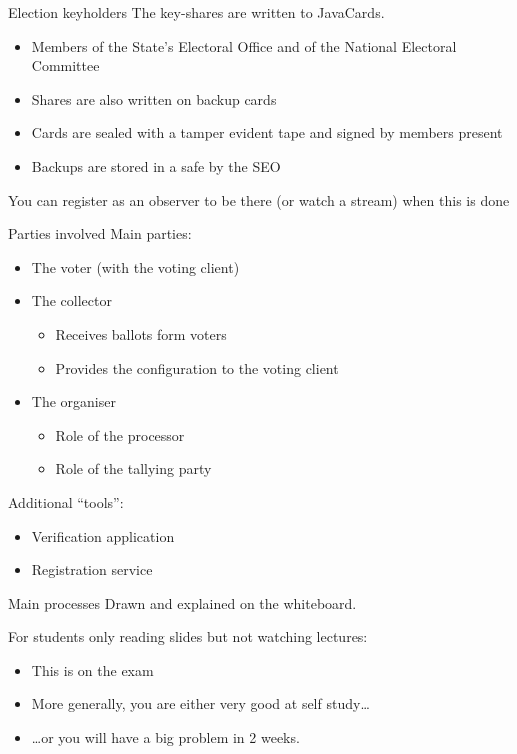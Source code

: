 \begin{frame}{Election keyholders}
  The key-shares are written to JavaCards.
  \begin{itemize}[<+(1)->]
    \item Members of the State's Electoral Office and of the National Electoral Committee
    \item Shares are also written on backup cards
    \item Cards are sealed with a tamper evident tape and signed by members present
    \item Backups are stored in a safe by the SEO
  \end{itemize}

  \vspace*{1em}

  \pause
  You can register as an observer to be there (or watch a stream) when this is done
\end{frame}

\begin{frame}{Parties involved}
  Main parties:
  \begin{itemize}[<+(1)->]
    \item The voter (with the voting client)
    \item The collector
    \begin{itemize}
      \item Receives ballots form voters
      \item Provides the configuration to the voting client
    \end{itemize}
    \item The organiser
    \begin{itemize}
      \item Role of the processor
      \item Role of the tallying party
    \end{itemize}
  \end{itemize}

  \pause
  Additional \enquote{tools}:
  \begin{itemize}[<+(1)->]
    \item Verification application
    \item Registration service 
  \end{itemize}
\end{frame}

\begin{frame}{Main processes}
  Drawn and explained on the whiteboard.

  \vspace*{1em}

  \pause
  For students only reading slides but not watching lectures:
  \begin{itemize}[<+(1)->]
    \item This is on the exam
    \item More generally, you are either very good at self study\dots
    \item \dots{}or you will have a big problem in 2 weeks.
  \end{itemize}
\end{frame}

